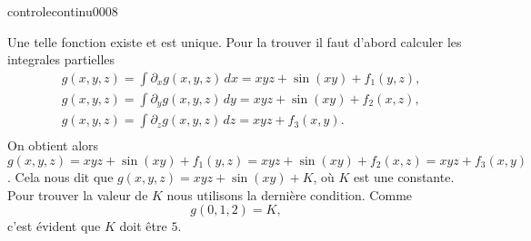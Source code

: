 \begin{corrige}{controlecontinu0008}
 
Une telle fonction existe et est unique. Pour la trouver il faut d'abord calculer les integrales partielles 
\begin{equation}
  \begin{aligned}
    &g(x,y,z)=\int \partial_xg(x,y,z)\, dx = xyz+\sin(xy)+f_1(y,z), \\
    &g(x,y,z)=\int \partial_yg(x,y,z)\, dy = xyz+\sin(xy)+f_2(x,z),\\
    &g(x,y,z)=\int \partial_zg(x,y,z)\, dz=xyz + f_3(x,y).\\
  \end{aligned}
\end{equation}
On obtient alors $g(x,y,z)= xyz+\sin(xy)+f_1(y,z)=xyz+\sin(xy)+f_2(x,z)=xyz + f_3(x,y) $. Cela nous dit que $g(x,y,z)=xyz+\sin(xy)+K $, où $K$ est une constante. Pour trouver la valeur de $K$ nous utilisons la dernière condition. Comme 
\[
g(0,1,2)= K,
\]
c'est évident que $K$ doit être $5$. 
\end{corrige}
